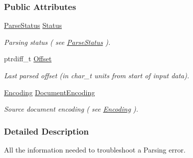 \subsubsection*{Public Attributes}
\begin{DoxyCompactItemize}
\item 
\hypertarget{structphys_1_1xml_1_1ParseResult_a1bf9dfeebdb07656723bbaf18ab612b5}{
\hyperlink{namespacephys_1_1xml_ae7aabb879b21c73d8183a54470f8917f}{ParseStatus} \hyperlink{structphys_1_1xml_1_1ParseResult_a1bf9dfeebdb07656723bbaf18ab612b5}{Status}}
\label{d5/dea/structphys_1_1xml_1_1ParseResult_a1bf9dfeebdb07656723bbaf18ab612b5}

\begin{DoxyCompactList}\small\item\em Parsing status ( see \hyperlink{namespacephys_1_1xml_ae7aabb879b21c73d8183a54470f8917f}{ParseStatus} ). \item\end{DoxyCompactList}\item 
\hypertarget{structphys_1_1xml_1_1ParseResult_a30b2a5fa6ceae01ab30c6ff48273ce41}{
ptrdiff\_\-t \hyperlink{structphys_1_1xml_1_1ParseResult_a30b2a5fa6ceae01ab30c6ff48273ce41}{Offset}}
\label{d5/dea/structphys_1_1xml_1_1ParseResult_a30b2a5fa6ceae01ab30c6ff48273ce41}

\begin{DoxyCompactList}\small\item\em Last parsed offset (in char\_\-t units from start of input data). \item\end{DoxyCompactList}\item 
\hypertarget{structphys_1_1xml_1_1ParseResult_a95c39cf7a95875a4cd9708656a976dfc}{
\hyperlink{namespacephys_1_1xml_a420f5de782438f88160321385bea2015}{Encoding} \hyperlink{structphys_1_1xml_1_1ParseResult_a95c39cf7a95875a4cd9708656a976dfc}{DocumentEncoding}}
\label{d5/dea/structphys_1_1xml_1_1ParseResult_a95c39cf7a95875a4cd9708656a976dfc}

\begin{DoxyCompactList}\small\item\em Source document encoding ( see \hyperlink{namespacephys_1_1xml_a420f5de782438f88160321385bea2015}{Encoding} ). \item\end{DoxyCompactList}\end{DoxyCompactItemize}


\subsubsection{Detailed Description}
All the information needed to troubleshoot a Parsing error. 

